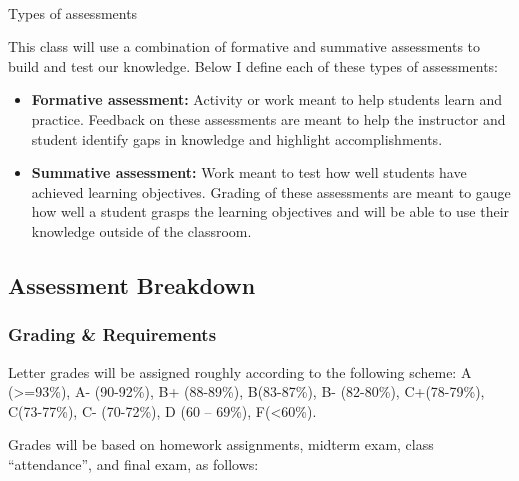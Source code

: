 \documentclass[
  letterpaper,
  DIV=11,
  numbers=noendperiod]{scrartcl}
\makeatletter
\let\oldparagraph\paragraph
\renewcommand{\paragraph}{
    \@ifstar
      \xxxParagraphStar
      \xxxParagraphNoStar
  }
\newcommand{\xxxParagraphStar}[1]{\oldparagraph*{#1}\mbox{}}
\newcommand{\xxxParagraphNoStar}[1]{\oldparagraph{#1}\mbox{}}
\makeatother
\begin{document}
\paragraph{Types of assessments}\label{types-of-assessments}

This class will use a combination of formative and summative assessments
to build and test our knowledge. Below I define each of these types of
assessments:

\begin{itemize}
\item
  \textbf{Formative assessment:} Activity or work meant to help students
  learn and practice. Feedback on these assessments are meant to help
  the instructor and student identify gaps in knowledge and highlight
  accomplishments.
\item
  \textbf{Summative assessment:} Work meant to test how well students
  have achieved learning objectives. Grading of these assessments are
  meant to gauge how well a student grasps the learning objectives and
  will be able to use their knowledge outside of the classroom.
\end{itemize}

\subsection{Assessment Breakdown}\label{assessment-breakdown}

\subsubsection{Grading \& Requirements}\label{grading-requirements}

Letter grades will be assigned roughly according to the following
scheme: A (\textgreater=93\%), A- (90-92\%), B+ (88-89\%), B(83-87\%),
B- (82-80\%), C+(78-79\%), C(73-77\%), C- (70-72\%), D (60 -- 69\%),
F(\textless60\%).

Grades will be based on homework assignments, midterm exam, class
``attendance'', and final exam, as follows:
\end{document}
